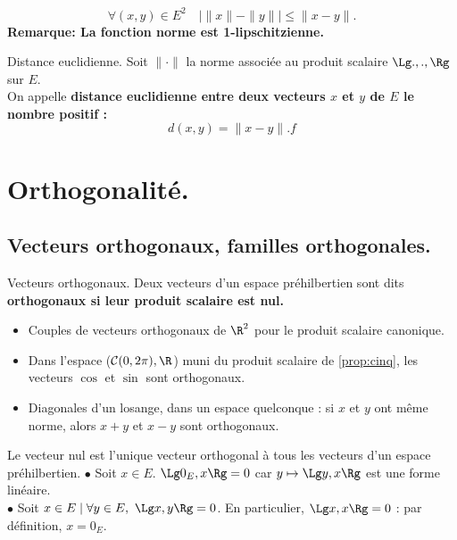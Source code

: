 \documentclass[11pt]{article}
\renewcommand*{\C}{\mathcal{C}}
\begin{document}
\begin{corr}{}{}
    \begin{equation*}
        \forall (x,y)\in E^2 \quad |\|x\|-\|y\||\leq\|x-y\|.
    \end{equation*}
    \bf{Remarque:} La fonction norme est 1-lipschitzienne.
\end{corr}

\begin{defi}{Distance euclidienne.}{}
    Soit $\|\cdot\|$ la norme associée au produit scalaire $\Lg.,.,\Rg$ sur $E$.\\
    On appelle \bf{distance euclidienne} entre deux vecteurs $x$ et $y$ de $E$ le nombre positif :
    \begin{equation*}
        d(x,y)=\|x-y\|.f
    \end{equation*}
\end{defi}

\section{Orthogonalité.}
\subsection{Vecteurs orthogonaux, familles orthogonales.}

\begin{defi}{Vecteurs orthogonaux.}{}
    Deux vecteurs d'un espace préhilbertien sont dits \bf{orthogonaux} si leur produit scalaire est nul.
\end{defi}

\begin{ex}{}{}
    \begin{itemize}[topsep=0pt,itemsep=-0.9 ex]
        \item Couples de vecteurs orthogonaux de $\R^2$ pour le produit scalaire canonique.
        \item Dans l'espace ($\C(0,2\pi),\R$) muni du produit scalaire de \ref{prop:cinq}, les vecteurs $\cos$ et $\sin$ sont orthogonaux.
        \item Diagonales d'un losange, dans un espace quelconque : si $x$ et $y$ ont même norme, alors $x+y$ et $x-y$ sont orthogonaux.
    \end{itemize}
\end{ex}

\begin{prop}{}{}
    Le vecteur nul est l'unique vecteur orthogonal à tous les vecteurs d'un espace préhilbertien.
    \tcblower
    $\bullet$ Soit $x\in E$. $\Lg 0_E, x \Rg = 0$ car $y\mapsto \Lg y, x \Rg$ est une forme linéaire.\\
    $\bullet$ Soit $x\in E \mid \forall y \in E, ~ \Lg x, y \Rg = 0$. En particulier, $\Lg x, x \Rg = 0$ : par définition, $x=0_E$.
\end{prop}
\end{document}
